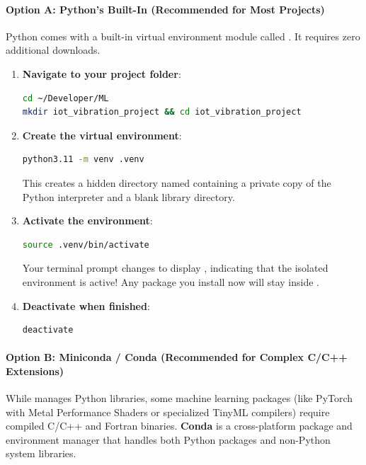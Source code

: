 \paragraph{Option A: Python's Built-In  (Recommended for Most Projects)}
Python comes with a built-in virtual environment module called . It requires zero additional downloads.

\begin{enumerate}
    \item \textbf{Navigate to your project folder}:
\begin{lstlisting}[language=bash]
cd ~/Developer/ML
mkdir iot_vibration_project && cd iot_vibration_project
\end{lstlisting}

    \item \textbf{Create the virtual environment}:
\begin{lstlisting}[language=bash]
python3.11 -m venv .venv
\end{lstlisting}
This creates a hidden directory named  containing a private copy of the Python interpreter and a blank  library directory.

    \item \textbf{Activate the environment}:
\begin{lstlisting}[language=bash]
source .venv/bin/activate
\end{lstlisting}
Your terminal prompt changes to display , indicating that the isolated environment is active! Any package you install now will stay inside .

    \item \textbf{Deactivate when finished}:
\begin{lstlisting}[language=bash]
deactivate
\end{lstlisting}
\end{enumerate}

\paragraph{Option B: Miniconda / Conda (Recommended for Complex C/C++ Extensions)}
While  manages Python libraries, some machine learning packages (like PyTorch with Metal Performance Shaders or specialized TinyML compilers) require compiled C/C++ and Fortran binaries. \textbf{Conda} is a cross-platform package and environment manager that handles both Python packages and non-Python system libraries.

